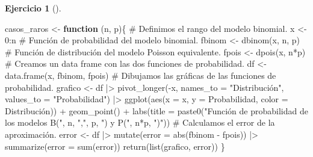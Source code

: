 \documentclass[
  a4paper,
]{scrreport}
\newenvironment{Shaded}{\begin{snugshade}}{\end{snugshade}}
\newcommand{\AttributeTok}[1]{\textcolor[rgb]{0.40,0.45,0.13}{#1}}
\newcommand{\CommentTok}[1]{\textcolor[rgb]{0.37,0.37,0.37}{#1}}
\newcommand{\ControlFlowTok}[1]{\textcolor[rgb]{0.00,0.23,0.31}{\textbf{#1}}}
\newcommand{\DecValTok}[1]{\textcolor[rgb]{0.68,0.00,0.00}{#1}}
\newcommand{\FunctionTok}[1]{\textcolor[rgb]{0.28,0.35,0.67}{#1}}
\newcommand{\NormalTok}[1]{\textcolor[rgb]{0.00,0.23,0.31}{#1}}
\newcommand{\OtherTok}[1]{\textcolor[rgb]{0.00,0.23,0.31}{#1}}
\newcommand{\SpecialCharTok}[1]{\textcolor[rgb]{0.37,0.37,0.37}{#1}}
\newcommand{\StringTok}[1]{\textcolor[rgb]{0.13,0.47,0.30}{#1}}
\theoremstyle{definition}
\newtheorem{exercise}{Ejercicio}[chapter]
\theoremstyle{remark}
\begin{document}
\begin{exercise}[]
\begin{enumerate}
  \begin{tcolorbox}[enhanced jigsaw, breakable, toptitle=1mm, colbacktitle=quarto-callout-tip-color!10!white, rightrule=.15mm, opacityback=0, opacitybacktitle=0.6, titlerule=0mm, coltitle=black, colframe=quarto-callout-tip-color-frame, colback=white, bottomtitle=1mm, leftrule=.75mm, toprule=.15mm, title=\textcolor{quarto-callout-tip-color}{\faLightbulb}\hspace{0.5em}{Solución}, arc=.35mm, bottomrule=.15mm, left=2mm]

\begin{Shaded}
\begin{Highlighting}[]
\NormalTok{casos\_raros }\OtherTok{\textless{}{-}} \ControlFlowTok{function}\NormalTok{ (n, p)\{}
    \CommentTok{\# Definimos el rango del modelo binomial.}
\NormalTok{    x }\OtherTok{\textless{}{-}} \DecValTok{0}\SpecialCharTok{:}\NormalTok{n}
    \CommentTok{\# Función de probabilidad del modelo binomial.}
\NormalTok{    fbinom }\OtherTok{\textless{}{-}} \FunctionTok{dbinom}\NormalTok{(x, n, p)}
    \CommentTok{\# Función de distribución del modelo Poisson equivalente.}
\NormalTok{    fpois }\OtherTok{\textless{}{-}} \FunctionTok{dpois}\NormalTok{(x, n}\SpecialCharTok{*}\NormalTok{p)}
    \CommentTok{\# Creamos un data frame con las dos funciones de probabilidad.}
\NormalTok{    df }\OtherTok{\textless{}{-}} \FunctionTok{data.frame}\NormalTok{(x, fbinom, fpois)}
    \CommentTok{\# Dibujamos las gráficas de las funciones de probabilidad.}
\NormalTok{    grafico }\OtherTok{\textless{}{-}}\NormalTok{ df  }\SpecialCharTok{|\textgreater{}} 
        \FunctionTok{pivot\_longer}\NormalTok{(}\SpecialCharTok{{-}}\NormalTok{x, }\AttributeTok{names\_to =} \StringTok{"Distribución"}\NormalTok{, }\AttributeTok{values\_to =} \StringTok{"Probabilidad"}\NormalTok{)  }\SpecialCharTok{|\textgreater{}} 
        \FunctionTok{ggplot}\NormalTok{(}\FunctionTok{aes}\NormalTok{(}\AttributeTok{x =}\NormalTok{ x, }\AttributeTok{y =}\NormalTok{ Probabilidad, }\AttributeTok{color =}\NormalTok{ Distribución)) }\SpecialCharTok{+} 
        \FunctionTok{geom\_point}\NormalTok{() }\SpecialCharTok{+}
        \FunctionTok{labs}\NormalTok{(}\AttributeTok{title =} \FunctionTok{paste0}\NormalTok{(}\StringTok{"Función de probabilidad de los modelos B("}\NormalTok{, n, }\StringTok{","}\NormalTok{, p, }\StringTok{") y P("}\NormalTok{, n}\SpecialCharTok{*}\NormalTok{p, }\StringTok{")"}\NormalTok{))}
    \CommentTok{\# Calculamos el error de la aproximación.}
\NormalTok{    error }\OtherTok{\textless{}{-}}\NormalTok{ df  }\SpecialCharTok{|\textgreater{}} 
        \FunctionTok{mutate}\NormalTok{(}\AttributeTok{error =} \FunctionTok{abs}\NormalTok{(fbinom }\SpecialCharTok{{-}}\NormalTok{ fpois))  }\SpecialCharTok{|\textgreater{}} 
        \FunctionTok{summarize}\NormalTok{(}\AttributeTok{error =} \FunctionTok{sum}\NormalTok{(error))}
    \FunctionTok{return}\NormalTok{(}\FunctionTok{list}\NormalTok{(grafico, error))}
\NormalTok{\}}


\end{Highlighting}
\end{Shaded}
\end{tcolorbox}
\end{enumerate}
\end{exercise}
\end{document}
